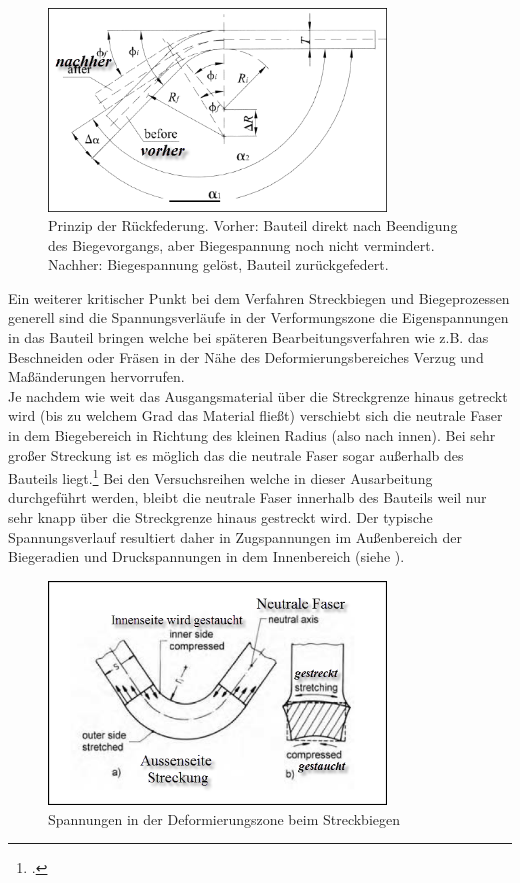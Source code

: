 \documentclass[12pt,a4paper,parskip]{scrartcl}
\begin{document}
 \begin{figure}[hbtp]
 \centering
 \includegraphics[width=0.8\textwidth]{springback}
 \caption[Rückfederung]{Prinzip der Rückfederung. Vorher: Bauteil direkt nach Beendigung des Biegevorgangs, aber Biegespannung noch nicht vermindert.
 Nachher: Biegespannung gelöst, Bauteil zurückgefedert.\protect\footnotemark}
 \label{fig:springback}
 \end{figure}
 
Ein weiterer kritischer Punkt bei dem Verfahren Streckbiegen und Biegeprozessen generell sind die Spannungsverläufe in der Verformungszone die Eigenspannungen in das Bauteil bringen welche bei späteren Bearbeitungsverfahren wie z.B. das Beschneiden oder Fräsen in der Nähe des Deformierungsbereiches Verzug und Maßänderungen hervorrufen.\\ Je nachdem wie weit das Ausgangsmaterial über die Streckgrenze hinaus getreckt wird (bis zu welchem Grad das Material fließt) verschiebt sich die neutrale Faser in dem Biegebereich in Richtung des kleinen Radius (also nach innen). Bei sehr großer Streckung ist es möglich das die neutrale Faser sogar außerhalb des Bauteils liegt.\footcite[Vgl.][374]{fu} Bei den Versuchsreihen welche in dieser Ausarbeitung durchgeführt werden, bleibt die neutrale Faser innerhalb des Bauteils weil nur sehr knapp über die Streckgrenze hinaus gestreckt wird. Der typische Spannungsverlauf resultiert daher in Zugspannungen im Außenbereich der Biegeradien und Druckspannungen in dem Innenbereich (siehe ).

\begin{figure}[hbtp]
\centering
\includegraphics[width=0.8\textwidth]{neutralefaser}
\caption[Spannungen in der Umformzone beim Streckbiegen]{Spannungen in der Deformierungszone beim Streckbiegen\protect\footnotemark}
\label{fig:neutralefaser}
\end{figure}
\end{document}
